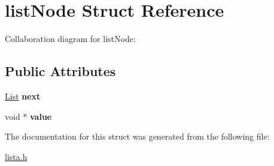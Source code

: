 \hypertarget{structlist_node}{}\section{list\+Node Struct Reference}
\label{structlist_node}


Collaboration diagram for list\+Node\+:
\subsection*{Public Attributes}
\begin{DoxyCompactItemize}
\item 
\mbox{\label{structlist_node_ac8957f39101f8155faeb994dd6ae4915}} 
\hyperlink{lista_8h_a698ff83165b8296011a50bb9aba83964}{List} {\bfseries next}
\item 
\mbox{\label{structlist_node_a772dfdd1352f9a568bb567d65cb7b92a}} 
void $\ast$ {\bfseries value}
\end{DoxyCompactItemize}


The documentation for this struct was generated from the following file\+:\begin{DoxyCompactItemize}
\item 
\hyperlink{lista_8h}{lista.\+h}\end{DoxyCompactItemize}
